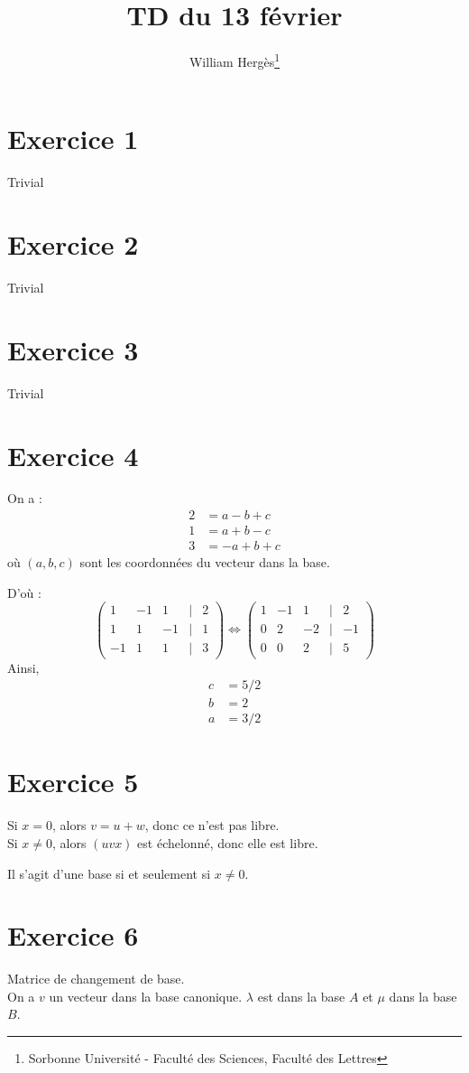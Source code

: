 \documentclass[a4paper, titlepage]{article}
\title{TD du 13 février}
\author{William Hergès\thanks{Sorbonne Université - Faculté des Sciences, Faculté des Lettres}}
\newenvironment{lititle}%
{\vspace{7mm}\LobsterTwo \large}%
{\\}
\begin{document}
	\maketitle
	\newpage
	\section*{Exercice 1}
	Trivial
	\section*{Exercice 2}
	Trivial
	\section*{Exercice 3}
	Trivial
	\section*{Exercice 4}
	On a :
	\begin{align*}
		2 &= a-b+c \\
		1 &= a+b-c \\
		3 &= -a+b+c
	\end{align*}
	où $(a,b,c)$ sont les coordonnées du vecteur dans la base.

	D'où :
	$$\begin{pmatrix} 1&-1&1&|&2\\1&1&-1&|&1\\-1&1&1&|&3 \end{pmatrix}\iff\begin{pmatrix} 1&-1&1&|&2\\0&2&-2&|&-1\\0&0&2&|&5\end{pmatrix}$$
	Ainsi,
	\begin{align*}
		c &= 5/2 \\
		b &= 2 \\
		a &= 3/2
	\end{align*}
	\section*{Exercice 5}
	Si $x=0$, alors $v = u + w$, donc ce n'est pas libre.\\
	Si $x\neq 0$, alors $(uvx)$ est échelonné, donc elle est libre.

	Il s'agit  d'une base si et seulement si $x\neq 0$.
	\section*{Exercice 6}
	\begin{lititle}
		Matrice de changement de base.
	\end{lititle}
	On a $v$ un vecteur dans la base canonique. $\lambda$ est dans la base $A$ et $\mu$ dans la base $B$.
\end{document}
